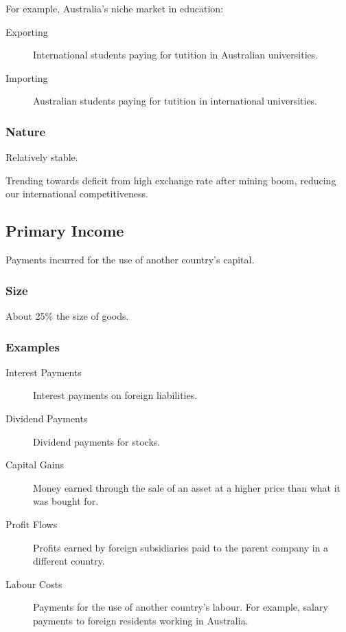 \documentclass[a4paper,11pt]{article}
\begin{document}
For example, Australia's niche market in education:

\begin{description}
\item [Exporting] International students paying for tutition in Australian
	universities.
\item [Importing] Australian students paying for tutition in international
	universities.
\end{description}


\subsubsection{Nature}

Relatively stable.

Trending towards deficit from high exchange rate after mining boom, reducing
our international competitiveness.


\subsection{Primary Income}

Payments incurred for the use of another country's capital.


\subsubsection{Size}

About 25\% the size of goods.


\subsubsection{Examples}

\begin{description}
\item [Interest Payments] Interest payments on foreign liabilities.
\item [Dividend Payments] Dividend payments for stocks.
\item [Capital Gains] Money earned through the sale of an asset at a higher
	price than what it was bought for.
\item [Profit Flows] Profits earned by foreign subsidiaries paid to the parent
	company in a different country.
\item [Labour Costs] Payments for the use of another country's labour. For
	example, salary payments to foreign residents working in Australia.
\end{description}
\end{document}
